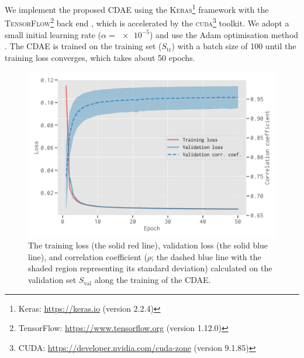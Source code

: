 \documentclass[fleqn,usenatbib]{mnras}
\newcommand{\R}[1]{\mathrm{#1}}
\newcommand{\editone}[1]{{\leavevmode\color{cyan}#1}}
\newcommand{\edittwo}[1]{{\leavevmode\color{magenta}#1}}
\begin{document}
We implement the proposed CDAE using the
\textsc{Keras}\footnote{Keras: \url{https://keras.io}
  (\editone{version 2.2.4})}
framework \citep{keras} with the
\textsc{TensorFlow}\footnote{TensorFlow:
  \url{https://www.tensorflow.org} (\editone{version 1.12.0})}
back end \citep{tensorflow},
\editone{%
which is accelerated by the \textsc{cuda}\footnote{\raggedright%
  CUDA: \url{https://developer.nvidia.com/cuda-zone} (version 9.1.85)}
toolkit.
We adopt a small initial learning rate ($\alpha = \num{e-5}$) and use the
Adam optimisation method \citep{kingma2015}.
The CDAE is trained on the training set ($S_{\R{tr}}$) with a batch size of
100 until the training loss converges, which takes about 50 epochs.
} %

\begin{figure}
  \centering
  \includegraphics[width=\columnwidth]{cdae-train}
  \caption{\label{fig:train}%
    The training loss (the solid red line), validation loss (the solid blue
    line), and correlation coefficient ($\rho$; the \edittwo{dashed blue
    line with the shaded region representing its standard deviation})
    calculated on the validation set $S_{\R{val}}$ along the training of
    the CDAE.
  }
\end{figure}
\end{document}

